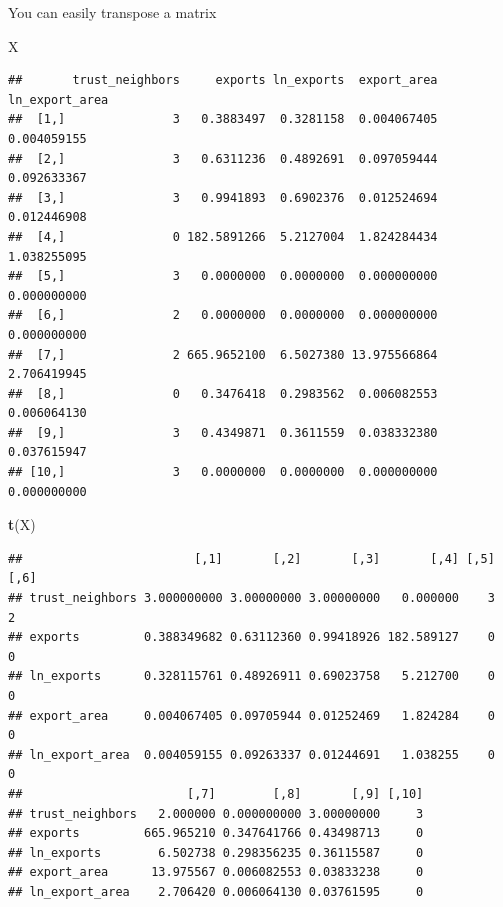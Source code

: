 \documentclass[]{book}
\newenvironment{Shaded}{\begin{snugshade}}{\end{snugshade}}
\newcommand{\KeywordTok}[1]{\textcolor[rgb]{0.13,0.29,0.53}{\textbf{#1}}}
\newcommand{\NormalTok}[1]{#1}
\theoremstyle{definition}
\theoremstyle{definition}
\theoremstyle{definition}
\theoremstyle{remark}
\begin{document}
You can easily transpose a matrix

\begin{Shaded}
\begin{Highlighting}[]
\NormalTok{X}
\end{Highlighting}
\end{Shaded}

\begin{verbatim}
##       trust_neighbors     exports ln_exports  export_area ln_export_area
##  [1,]               3   0.3883497  0.3281158  0.004067405    0.004059155
##  [2,]               3   0.6311236  0.4892691  0.097059444    0.092633367
##  [3,]               3   0.9941893  0.6902376  0.012524694    0.012446908
##  [4,]               0 182.5891266  5.2127004  1.824284434    1.038255095
##  [5,]               3   0.0000000  0.0000000  0.000000000    0.000000000
##  [6,]               2   0.0000000  0.0000000  0.000000000    0.000000000
##  [7,]               2 665.9652100  6.5027380 13.975566864    2.706419945
##  [8,]               0   0.3476418  0.2983562  0.006082553    0.006064130
##  [9,]               3   0.4349871  0.3611559  0.038332380    0.037615947
## [10,]               3   0.0000000  0.0000000  0.000000000    0.000000000
\end{verbatim}

\begin{Shaded}
\begin{Highlighting}[]
\KeywordTok{t}\NormalTok{(X)}
\end{Highlighting}
\end{Shaded}

\begin{verbatim}
##                        [,1]       [,2]       [,3]       [,4] [,5] [,6]
## trust_neighbors 3.000000000 3.00000000 3.00000000   0.000000    3    2
## exports         0.388349682 0.63112360 0.99418926 182.589127    0    0
## ln_exports      0.328115761 0.48926911 0.69023758   5.212700    0    0
## export_area     0.004067405 0.09705944 0.01252469   1.824284    0    0
## ln_export_area  0.004059155 0.09263337 0.01244691   1.038255    0    0
##                       [,7]        [,8]       [,9] [,10]
## trust_neighbors   2.000000 0.000000000 3.00000000     3
## exports         665.965210 0.347641766 0.43498713     0
## ln_exports        6.502738 0.298356235 0.36115587     0
## export_area      13.975567 0.006082553 0.03833238     0
## ln_export_area    2.706420 0.006064130 0.03761595     0
\end{verbatim}
\end{document}
